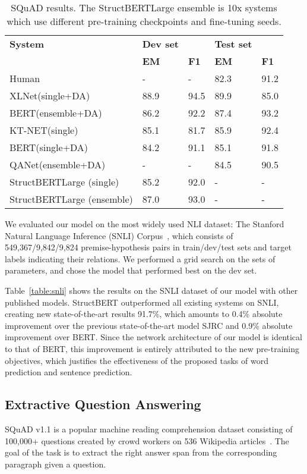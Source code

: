 \documentclass{article}
\begin{document}
\begin{table*}[t]
\begin{center}
\begin{tabular}{lllll}
\hline
\bf System & \bf Dev set && \bf Test set & \\
 & \bf EM & \bf F1 & \bf EM & \bf F1 \\
\hline
Human & - & - & 82.3 & 91.2 \\
XLNet(single+DA) ~\cite{yang2019xlnet} & 88.9 & 94.5 & 89.9 & 85.0 \\
BERT(ensemble+DA) ~\cite{devlin2018bert}& 86.2 & 92.2 & 87.4 & 93.2 \\
KT-NET(single) ~\cite{yang2019enhancing}& 85.1 & 81.7 & 85.9 & 92.4 \\
BERT(single+DA) ~\cite{devlin2018bert}& 84.2 & 91.1 & 85.1 & 91.8 \\
QANet(ensemble+DA)~\cite{yu2018qanet} &- & - & 84.5 & 90.5\\
\hline
StructBERT{\small Large} (single) & 85.2& 92.0& - & - \\
StructBERT{\small Large} (ensemble) &  87.0 & 93.0 & - & - \\
\hline
\end{tabular}
\end{center}
\caption{SQuAD results. The StructBERT{\small Large} ensemble is 10x systems which use different pre-training checkpoints and fine-tuning seeds.}
\label{table:squad}
\end{table*}

We evaluated our model on the most widely used NLI dataset: The Stanford Natural Language Inference (SNLI) Corpus~\cite{bowman2015large}, which consists of 549,367/9,842/9,824 premise-hypothesis pairs in train/dev/test sets and target labels indicating their relations. 
We performed a grid search on the sets of parameters, and chose the model that performed best on the dev set.

Table~\ref{table:snli} shows the results on the SNLI dataset of our model with other published models. StructBERT outperformed all existing systems on SNLI, creating new state-of-the-art results 91.7\%, which amounts to 0.4\% absolute improvement over the previous state-of-the-art model SJRC and 0.9\% absolute improvement over BERT. Since the network architecture of our model is identical to that of BERT, this improvement is entirely attributed to the new pre-training objectives, which justifies the effectiveness of the proposed tasks of word prediction and sentence prediction.

\subsection{Extractive Question Answering}
SQuAD v1.1 is a popular machine reading comprehension dataset consisting of 100,000+ questions created by crowd workers on 536 Wikipedia articles~\cite{rajpurkar2016squad}. The goal of the task is to extract the right answer span from the corresponding paragraph given a question.
\end{document}
